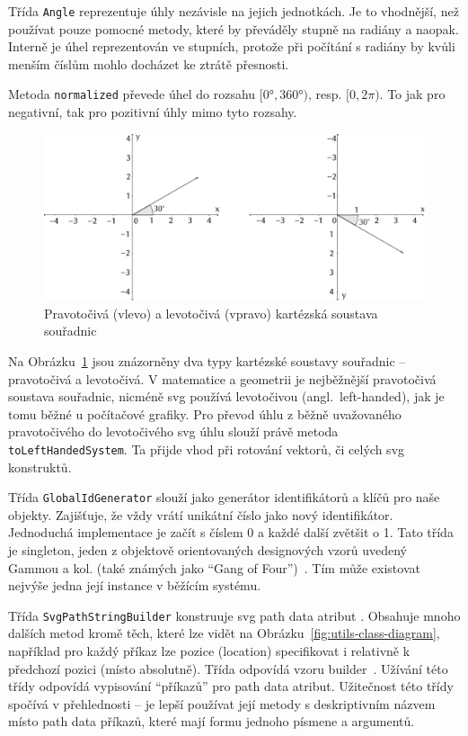 Třída \texttt{Angle} reprezentuje úhly nezávisle na jejich jednotkách.
Je to vhodnější, než používat pouze pomocné metody, které by převáděly stupně na radiány a naopak.
Interně je úhel reprezentován ve stupních, protože při počítání s radiány by kvůli menším číslům mohlo docházet ke ztrátě přesnosti.

Metoda \texttt{normalized} převede úhel do rozsahu $[0°, 360°)$, resp. $[0, 2\pi)$.
To jak pro negativní, tak pro pozitivní úhly mimo tyto rozsahy.

\begin{figure}[!htb]
  \centering
  \includegraphics[width=\maxwidth{\textwidth}]{../img/cartesian-systems.pdf}
  \caption[Pravotočivá a levotočivá kartézská soustava souřadnic]{Pravotočivá (vlevo) a levotočivá (vpravo) kartézská soustava souřadnic}
  \label{fig:cartesian-systems}
\end{figure}

Na Obrázku~\ref{fig:cartesian-systems} jsou znázorněny dva typy kartézské soustavy souřadnic -- pravotočivá a levotočivá.
V matematice a geometrii je nejběžnější pravotočivá soustava souřadnic, nicméně \acrshort{svg} používá levotočivou (angl.~left-handed), jak je tomu běžné u počítačové grafiky.
Pro převod úhlu z běžně uvažovaného pravotočivého do levotočivého \acrshort{svg} úhlu slouží právě metoda \texttt{toLeftHandedSystem}.
Ta přijde vhod při rotování vektorů, či celých \acrshort{svg} konstruktů.

Třída \texttt{GlobalIdGenerator} slouží jako generátor identifikátorů a klíčů pro naše objekty.
Zajišťuje, že vždy vrátí unikátní číslo jako nový identifikátor.
Jednoduchá implementace je začít s číslem 0 a každé další zvětšit o 1.
Tato třída je singleton, jeden z objektově orientovaných designových vzorů uvedený Gammou a kol. (také známých jako \enquote{Gang of Four})~\cite[s.~144]{gamma_designpatterns_1995}.
Tím může existovat nejvýše jedna její instance v běžícím systému.

Třída \texttt{SvgPathStringBuilder} konstruuje \acrshort{svg} path data atribut \cite[\S~9.3]{brinza_svg_2018}.
Obsahuje mnoho dalších metod kromě těch, které lze vidět na Obrázku~\ref{fig:utils-class-diagram}, například pro každý příkaz lze pozice (location) specifikovat i relativně k předchozí pozici (místo absolutně).
Třída odpovídá vzoru builder~\cite[s.~110]{gamma_designpatterns_1995}.
Užívání této třídy odpovídá vypisování \enquote{příkazů} pro path data atribut.
Užitečnost této třídy spočívá v přehlednosti -- je lepší používat její metody s deskriptivním názvem místo path data příkazů, které mají formu jednoho písmene a argumentů.

